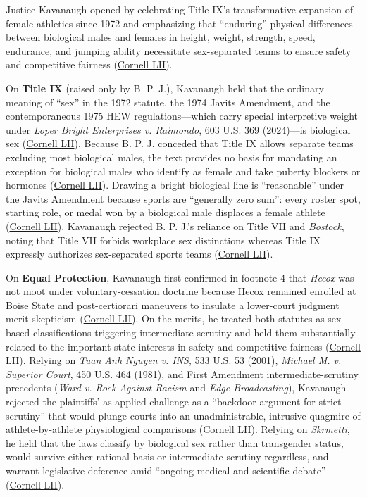 \documentclass[12pt]{article}
\begin{document}
Justice Kavanaugh opened by celebrating Title IX's transformative expansion of female athletics since 1972 and emphasizing that ``enduring'' physical differences between biological males and females in height, weight, strength, speed, endurance, and jumping ability necessitate sex-separated teams to ensure safety and competitive fairness (\href{https://www.law.cornell.edu/supremecourt/text/24-43}{Cornell LII}).

On \textbf{Title IX} (raised only by B. P. J.), Kavanaugh held that the ordinary meaning of ``sex'' in the 1972 statute, the 1974 Javits Amendment, and the contemporaneous 1975 HEW regulations---which carry special interpretive weight under \textit{Loper Bright Enterprises v. Raimondo}, 603 U.S. 369 (2024)---is biological sex (\href{https://www.law.cornell.edu/supremecourt/text/24-43}{Cornell LII}). Because B. P. J. conceded that Title IX allows separate teams excluding most biological males, the text provides no basis for mandating an exception for biological males who identify as female and take puberty blockers or hormones (\href{https://www.law.cornell.edu/supremecourt/text/24-43}{Cornell LII}). Drawing a bright biological line is ``reasonable'' under the Javits Amendment because sports are ``generally zero sum'': every roster spot, starting role, or medal won by a biological male displaces a female athlete (\href{https://www.law.cornell.edu/supremecourt/text/24-43}{Cornell LII}). Kavanaugh rejected B. P. J.'s reliance on Title VII and \textit{Bostock}, noting that Title VII forbids workplace sex distinctions whereas Title IX expressly authorizes sex-separated sports teams (\href{https://www.law.cornell.edu/supremecourt/text/24-43}{Cornell LII}).

On \textbf{Equal Protection}, Kavanaugh first confirmed in footnote 4 that \textit{Hecox} was not moot under voluntary-cessation doctrine because Hecox remained enrolled at Boise State and post-certiorari maneuvers to insulate a lower-court judgment merit skepticism (\href{https://www.law.cornell.edu/supremecourt/text/24-43}{Cornell LII}). On the merits, he treated both statutes as sex-based classifications triggering intermediate scrutiny and held them substantially related to the important state interests in safety and competitive fairness (\href{https://www.law.cornell.edu/supremecourt/text/24-43}{Cornell LII}). Relying on \textit{Tuan Anh Nguyen v. INS}, 533 U.S. 53 (2001), \textit{Michael M. v. Superior Court}, 450 U.S. 464 (1981), and First Amendment intermediate-scrutiny precedents (\textit{Ward v. Rock Against Racism} and \textit{Edge Broadcasting}), Kavanaugh rejected the plaintiffs' as-applied challenge as a ``backdoor argument for strict scrutiny'' that would plunge courts into an unadministrable, intrusive quagmire of athlete-by-athlete physiological comparisons (\href{https://www.law.cornell.edu/supremecourt/text/24-43}{Cornell LII}). Relying on \textit{Skrmetti}, he held that the laws classify by biological sex rather than transgender status, would survive either rational-basis or intermediate scrutiny regardless, and warrant legislative deference amid ``ongoing medical and scientific debate'' (\href{https://www.law.cornell.edu/supremecourt/text/24-43}{Cornell LII}).
\end{document}
